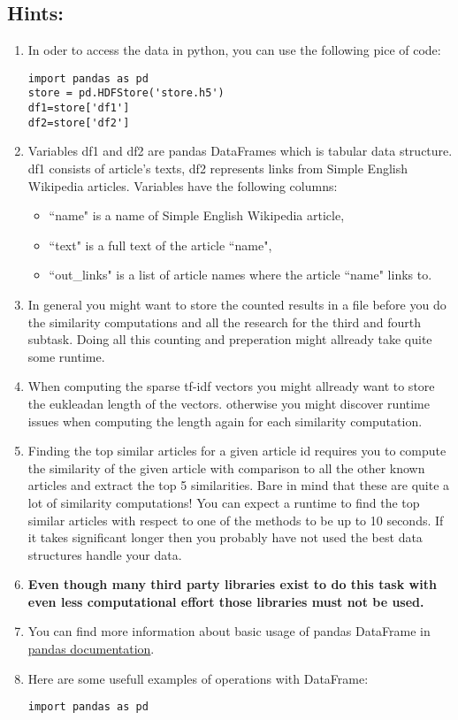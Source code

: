 \documentclass{WeSTassignment}
\begin{document}
\subsection{Hints:}
\begin{enumerate}
\item In oder to access the data in python, you can use the following pice of code:
\begin{verbatim} 
import pandas as pd
store = pd.HDFStore('store.h5')
df1=store['df1'] 
df2=store['df2'] 
\end{verbatim}
\item Variables df1 and df2 are pandas DataFrames which is tabular data structure. df1 consists of article's texts, df2 represents links from Simple English Wikipedia articles. Variables have the following columns:
\begin{itemize}
\item ``name" is a name of Simple English Wikipedia article,
\item ``text" is a full text of the article ``name",
\item ``out\_links" is a list of article names where the article ``name" links to.
\end{itemize}
\item In general you might want to store the counted results in a file before you do the similarity computations and all the research for the third and fourth subtask. Doing all this counting and preperation might allready take quite some runtime. 
\item When computing the sparse tf-idf vectors you might allready want to store the eukleadan length of the vectors. otherwise you might discover runtime issues when computing the length again for each similarity computation. 
\item Finding the top similar articles for a given article id requires you to compute the similarity of the given article with comparison to all the other known articles and extract the top 5 similarities. Bare in mind that these are quite a lot of similarity computations! You can expect a runtime to find the top similar articles with respect to one of the methods to be up to 10 seconds. If it takes significant longer then you probably have not used the best data structures handle your data.
\item \textbf{Even though many third party libraries exist to do this task with even less computational effort those libraries must not be used.}
\item You can find more information about basic usage of pandas DataFrame in  \href{http://pandas.pydata.org/pandas-docs/stable/dsintro.html#column-selection-addition-deletion}{pandas documentation}.
\item Here are some usefull examples of operations with DataFrame:
\begin{verbatim} 
import pandas as pd


\end{verbatim}
\end{enumerate}
\end{document}
